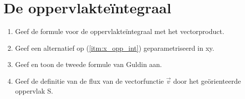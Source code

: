 \documentclass[12pt]{article}
\begin{document}
    \maketitle

    \section{De oppervlakte\"integraal}
    \begin{enumerate}
        \item \label{itm:x_opp_int} Geef de formule voor de oppervlakte\"integraal met het vectorproduct.
        \item Geef een alternatief op (\ref{itm:x_opp_int}) geparametriseerd in xy.
        \item Geef en toon de tweede formule van Guldin aan.
        \item Geef de definitie van de flux van de vectorfunctie $\vec{v}$ door het ge\"orienteerde oppervlak S.
    \end{enumerate}
    
\end{document}
